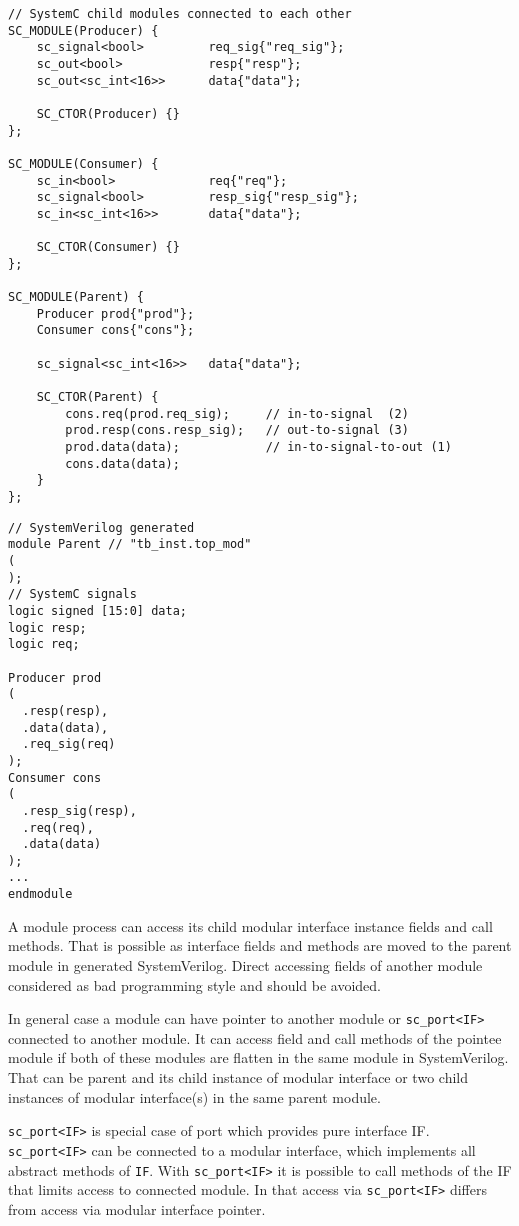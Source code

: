 \begin{lstlisting}[style=mycpp]
// SystemC child modules connected to each other
SC_MODULE(Producer) {
    sc_signal<bool>         req_sig{"req_sig"};
    sc_out<bool>            resp{"resp"};
    sc_out<sc_int<16>>      data{"data"};
    
    SC_CTOR(Producer) {}
};

SC_MODULE(Consumer) {
    sc_in<bool>             req{"req"};
    sc_signal<bool>         resp_sig{"resp_sig"};
    sc_in<sc_int<16>>       data{"data"};
    
    SC_CTOR(Consumer) {}
};

SC_MODULE(Parent) {
    Producer prod{"prod"};
    Consumer cons{"cons"};
    
    sc_signal<sc_int<16>>   data{"data"};

    SC_CTOR(Parent) {
        cons.req(prod.req_sig);     // in-to-signal  (2)
        prod.resp(cons.resp_sig);   // out-to-signal (3)       
        prod.data(data);            // in-to-signal-to-out (1)
        cons.data(data);
    }
};
\end{lstlisting}
%
\begin{lstlisting}[style=myverilog]
// SystemVerilog generated
module Parent // "tb_inst.top_mod"
(
);
// SystemC signals
logic signed [15:0] data;
logic resp;
logic req;

Producer prod
(
  .resp(resp),
  .data(data),
  .req_sig(req)
);
Consumer cons
(
  .resp_sig(resp),
  .req(req),
  .data(data)
);
...
endmodule
\end{lstlisting}

A module process can access its child modular interface instance fields and call methods. That is possible as interface fields and methods are moved to the parent module in generated SystemVerilog. Direct accessing fields of another module considered as bad programming style and should be avoided. 

In general case a module can have pointer to another module or {\tt sc\_port<IF>} connected to another module. It can access field and call methods of the pointee module if both of these modules are flatten in the same module in SystemVerilog. That can be parent and its child instance of modular interface or two child instances of modular interface(s) in the same parent module.

{\tt sc\_port<IF>} is special case of port which provides pure interface IF. {\tt sc\_port<IF>} can be connected to a modular interface, which implements all abstract methods of {\tt IF}. With {\tt sc\_port<IF>} it is possible to call methods of the IF that limits access to connected module. In that access via {\tt sc\_port<IF>} differs from access via modular interface pointer.

